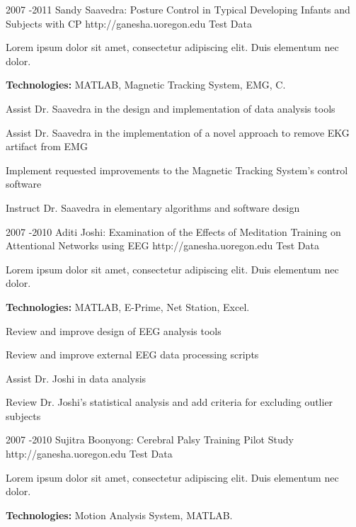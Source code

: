 \documentclass[10pt]{article} %
\begin{document}

\job
{2007 -}{2011}
{Sandy Saavedra: Posture Control in Typical Developing Infants and Subjects with CP}
{http://ganesha.uoregon.edu}
{Test Data}
{Lorem ipsum dolor sit amet, consectetur adipiscing elit. Duis elementum nec dolor. \\
\rule{0mm}{5mm}\textbf{Technologies:} MATLAB, Magnetic Tracking System, EMG, C.}

\begin{itemize-noindent}
\item{Assist Dr. Saavedra in the design and implementation of data analysis tools}
\item{Assist Dr. Saavedra in the implementation of a novel approach to remove EKG artifact from EMG}
\item{Implement requested improvements to the Magnetic Tracking System's control software}
\item{Instruct Dr. Saavedra in elementary algorithms and software design}
\end{itemize-noindent}


\job
{2007 -}{2010}
{Aditi Joshi: Examination of the Effects of Meditation Training on Attentional Networks using EEG}
{http://ganesha.uoregon.edu}
{Test Data}
{Lorem ipsum dolor sit amet, consectetur adipiscing elit. Duis elementum nec dolor. \\
\rule{0mm}{5mm}\textbf{Technologies:} MATLAB, E-Prime, Net Station, Excel.}

\begin{itemize-noindent}
\item{Review and improve design of EEG analysis tools}
\item{Review and improve external EEG data processing scripts}
\item{Assist Dr. Joshi in data analysis}
\item{Review Dr. Joshi's statistical analysis and add criteria for excluding outlier subjects}
\end{itemize-noindent}


\job
{2007 -}{2010}
{Sujitra Boonyong: Cerebral Palsy Training Pilot Study}
{http://ganesha.uoregon.edu}
{Test Data}
{Lorem ipsum dolor sit amet, consectetur adipiscing elit. Duis elementum nec dolor. \\
\rule{0mm}{5mm}\textbf{Technologies:} Motion Analysis System, MATLAB.}
\end{document}
